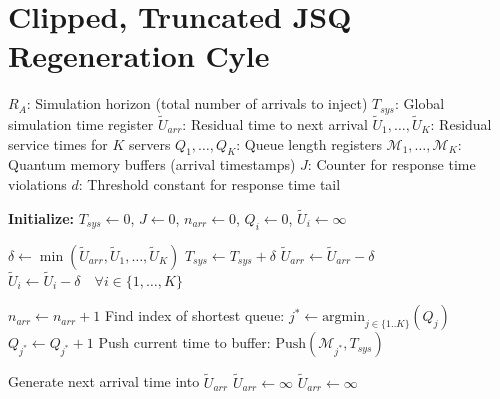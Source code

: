 \documentclass[11pt]{article}
\begin{document}
\section{Clipped, Truncated JSQ Regeneration Cyle}
\label{app:JSQ}



\begin{algorithm}[h]
\caption{A Clipped, Truncated Regeneration Cycle of JSQ}
\label{alg:qdes_mgk_latency}
\ssmall
\begin{algorithmic}[1]
\Require 
    \Statex $R_A$: Simulation horizon (total number of arrivals to inject)
    \Statex $T_{sys}$: Global simulation time register
    \Statex $\tilde{U}_{arr}$: Residual time to next arrival
    \Statex $\tilde{U}_{1}, \dots, \tilde{U}_{K}$: Residual service times for $K$ servers
    \Statex $Q_{1}, \dots, Q_{K}$: Queue length registers
    \Statex $\mathcal{M}_{1}, \dots, \mathcal{M}_{K}$: Quantum memory buffers (arrival timestamps)
    \Statex $J$: Counter for response time violations
    \Statex $d$: Threshold constant for response time tail

\State \textbf{Initialize:} $T_{sys} \gets 0$, $J \gets 0$, $n_{arr} \gets 0$, $Q_i \gets 0$, $\tilde{U}_i \gets \infty$

\State {}

    \State {}
    \State $\delta \gets \min(\tilde{U}_{arr}, \tilde{U}_1, \dots, \tilde{U}_K)$
    \State $T_{sys} \gets T_{sys} + \delta$
    \State $\tilde{U}_{arr} \gets \tilde{U}_{arr} - \delta$
    \State $\tilde{U}_i \gets \tilde{U}_i - \delta \quad \forall i \in \{1, \dots, K\}$

    \State {}
            \State $n_{arr} \gets n_{arr} + 1$
            \State Find index of shortest queue: $j^* \gets \text{argmin}_{j \in \{1..K\}} (Q_j)$
            \State $Q_{j^*} \gets Q_{j^*} + 1$
            \State Push current time to buffer: $\text{Push}(\mathcal{M}_{j^*}, T_{sys})$
            
                \State Generate next arrival time into $\tilde{U}_{arr}$
            \Else
                \State $\tilde{U}_{arr} \gets \infty$ 
            \EndIf
        \Else
             \State $\tilde{U}_{arr} \gets \infty$ 
        \EndIf
    \EndIf


\end{algorithmic}
\end{algorithm}
\end{document}
